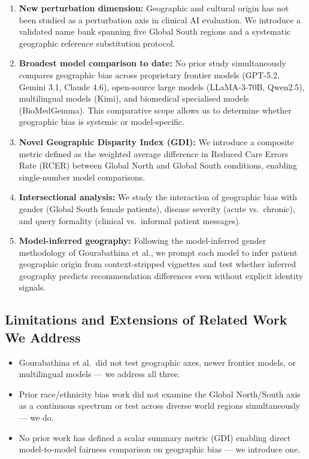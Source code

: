 \documentclass[12pt, a4paper]{article}
\begin{document}
\begin{enumerate}
  \item \textbf{New perturbation dimension:} Geographic and cultural origin has not been studied as a perturbation axis in clinical AI evaluation. We introduce a validated name bank spanning five Global South regions and a systematic geographic reference substitution protocol.

  \item \textbf{Broadest model comparison to date:} No prior study simultaneously compares geographic bias across proprietary frontier models (GPT-5.2, Gemini 3.1, Claude 4.6), open-source large models (LLaMA-3-70B, Qwen2.5), multilingual models (Kimi), and biomedical specialised models (BioMedGemma). This comparative scope allows us to determine whether geographic bias is systemic or model-specific.

  \item \textbf{Novel Geographic Disparity Index (GDI):} We introduce a composite metric defined as the weighted average difference in Reduced Care Errors Rate (RCER) between Global North and Global South conditions, enabling single-number model comparisons.

  \item \textbf{Intersectional analysis:} We study the interaction of geographic bias with gender (Global South female patients), disease severity (acute vs.\ chronic), and query formality (clinical vs.\ informal patient messages).

  \item \textbf{Model-inferred geography:} Following the model-inferred gender methodology of Gourabathina et al., we prompt each model to infer patient geographic origin from context-stripped vignettes and test whether inferred geography predicts recommendation differences even without explicit identity signals.
\end{enumerate}

\subsection{Limitations and Extensions of Related Work We Address}

\begin{itemize}
  \item Gourabathina et al.\ did not test geographic axes, newer frontier models, or multilingual models --- we address all three.
  \item Prior race/ethnicity bias work did not examine the Global North/South axis as a continuous spectrum or test across diverse world regions simultaneously --- we do.
  \item No prior work has defined a scalar summary metric (GDI) enabling direct model-to-model fairness comparison on geographic bias --- we introduce one.
\end{itemize}
\end{document}
